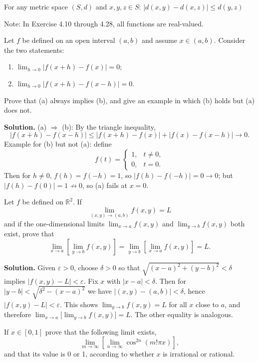 \begin{theorem}
For any metric space $(S,d)$ and $x,y,z \in S$: $|d(x,y) - d(x,z)| \leq d(y,z)$
\end{theorem}

Note: In Exercise 4.10 through 4.28, all functions are real-valued.

\begin{problembox}
Let $f$ be defined on an open interval $(a, b)$ and assume $x \in (a, b)$. Consider the two statements:
\begin{enumerate}[label=(\alph*)]
\item $\lim_{h \to 0} |f(x + h) - f(x)| = 0$;
\item $\lim_{h \to 0} |f(x + h) - f(x - h)| = 0$.
\end{enumerate}
Prove that (a) always implies (b), and give an example in which (b) holds but (a) does not.
\end{problembox}

\noindent\textbf{Solution.}
(a) $\Rightarrow$ (b): By the triangle inequality,
\[
|f(x+h)-f(x-h)|\le |f(x+h)-f(x)|+|f(x)-f(x-h)|\to 0.
\]
Example for (b) but not (a): define
\[
f(t)=\begin{cases}
1,& t\ne 0,\\
0,& t=0.
\end{cases}
\]
Then for $h\ne 0$, $f(h)=f(-h)=1$, so $|f(h)-f(-h)|=0\to 0$; but $|f(h)-f(0)|=1\not\to 0$, so (a) fails at $x=0$.
\medskip

\begin{problembox}
Let $f$ be defined on $\mathbb{R}^2$. If
\[\lim_{(x, y) \to (a, b)} f(x, y) = L\]
and if the one-dimensional limits $\lim_{x \to a} f(x, y)$ and $\lim_{y \to b} f(x, y)$ both exist, prove that
\[\lim_{x \to a} \left[ \lim_{y \to b} f(x, y) \right] = \lim_{y \to b} \left[ \lim_{x \to a} f(x, y) \right] = L.\]
\end{problembox}

\noindent\textbf{Solution.}
Given $\varepsilon>0$, choose $\delta>0$ so that $\sqrt{(x-a)^2+(y-b)^2}<\delta$ implies $|f(x,y)-L|<\varepsilon$. Fix $x$ with $|x-a|<\delta$. Then for $|y-b|<\sqrt{\delta^2-(x-a)^2}$ we have $|(x,y)-(a,b)|<\delta$, hence $|f(x,y)-L|<\varepsilon$. This shows $\lim_{y\to b}f(x,y)=L$ for all $x$ close to $a$, and therefore $\lim_{x\to a}\big[\lim_{y\to b}f(x,y)\big]=L$. The other equality is analogous.
\medskip


\begin{problembox}
If \( x \in [0, 1] \) prove that the following limit exists,
\[\lim_{m \to \infty} \left[ \lim_{n \to \infty} \cos^{2n} (m! \pi x) \right],\]
and that its value is 0 or 1, according to whether \( x \) is irrational or rational.
\end{problembox}

